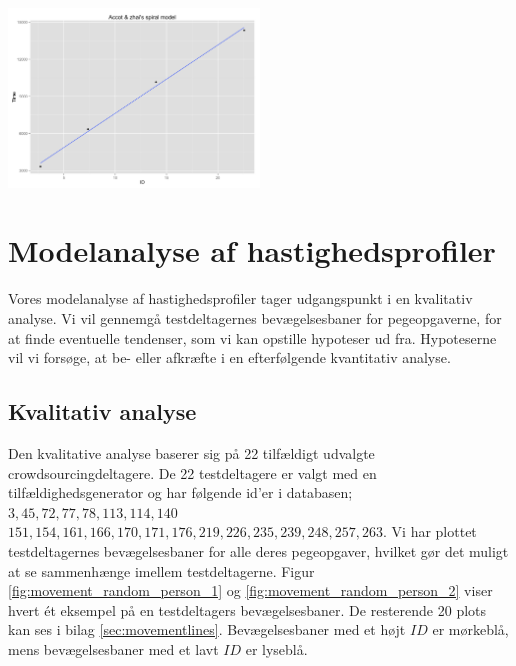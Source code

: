 \begin{minipage}{\linewidth}
	\begin{minipage}[t]{\linewidth}
		\centering
		\includegraphics[width=0.5\textwidth]{images/plots/plot_model_spiral_accot}
		\label{fig:accot_spiral_line}
	\end{minipage}
\end{minipage}

\newpage
{}
\section*{Modelanalyse af hastighedsprofiler}
Vores modelanalyse af hastighedsprofiler tager udgangspunkt i en kvalitativ analyse. Vi vil gennemgå testdeltagernes bevægelsesbaner for pegeopgaverne, for at finde eventuelle tendenser, som vi kan opstille hypoteser ud fra. Hypoteserne vil vi forsøge, at be- eller afkræfte i en efterfølgende kvantitativ analyse.

\subsection*{Kvalitativ analyse}
Den kvalitative analyse baserer sig på 22 tilfældigt udvalgte crowdsourcingdeltagere. De 22 testdeltagere er valgt med en tilfældighedsgenerator og har følgende id'er i databasen; $3,45,72,77,78,113,114,140$ $151,154,161,166,170,171,176,219,226,235,239,248,257,263$. Vi har plottet testdeltagernes bevægelsesbaner for alle deres pegeopgaver, hvilket gør det muligt at se sammenhænge imellem testdeltagerne. Figur \ref{fig:movement_random_person_1} og \ref{fig:movement_random_person_2} viser hvert ét eksempel på en testdeltagers bevægelsesbaner. De resterende 20 plots kan ses i bilag \ref{sec:movementlines}. Bevægelsesbaner med et højt $ID$ er mørkeblå, mens bevægelsesbaner med et lavt $ID$ er lyseblå.

